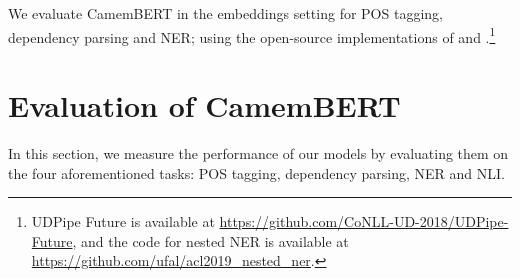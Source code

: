 \documentclass[11pt,a4paper]{article}
\newcommand{\camembert}{CamemBERT\xspace}
\begin{document}
We evaluate \camembert in the embeddings setting for POS tagging, dependency parsing and NER; using the open-source implementations of  and .\footnote{UDPipe Future is available at \url{https://github.com/CoNLL-UD-2018/UDPipe-Future}, and the code for nested NER is available at \url{https://github.com/ufal/acl2019_nested_ner}.}



\section{Evaluation of \camembert}


In this section, we measure the performance of our models by evaluating them on the four aforementioned tasks: POS tagging, dependency parsing, NER and NLI.
\end{document}
